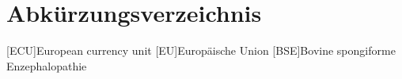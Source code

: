 \chapter{Abkürzungsverzeichnis}
\begin{acronym}[ECU]
[ECU]{European currency unit}
[EU]{Europäische Union}
[BSE]{Bovine spongiforme Enzephalopathie}
\end{acronym}